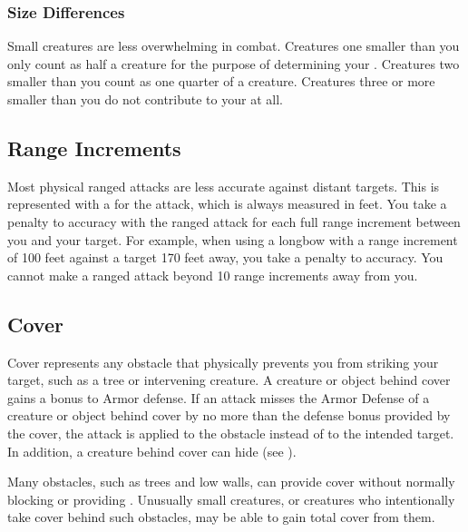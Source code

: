         \subsubsection{Size Differences}
            Small creatures are less overwhelming in combat.
            Creatures one  smaller than you only count as half a creature for the purpose of determining your .
            Creatures two  smaller than you count as one quarter of a creature.
            Creatures three or more  smaller than you do not contribute to your  at all.

    \subsection{Range Increments}\label{Range Increments}
        Most physical ranged attacks are less accurate against distant targets.
        This is represented with a  for the attack, which is always measured in feet.
        You take a  penalty to accuracy with the ranged attack for each full range increment between you and your target.
        For example, when using a longbow with a range increment of 100 feet against a target 170 feet away, you take a  penalty to accuracy.
        You cannot make a ranged attack beyond 10 range increments away from you.

    \subsection{Cover}\label{Cover}

        Cover represents any obstacle that physically prevents you from striking your target, such as a tree or intervening creature.
        A creature or object behind cover gains a  bonus to Armor defense.
        If an attack misses the Armor Defense of a creature or object behind cover by no more than the defense bonus provided by the cover,
        the attack is applied to the obstacle instead of to the intended target.
        In addition, a creature behind cover can hide (see ).

         Many obstacles, such as trees and low walls, can provide cover without normally blocking  or providing .
        Unusually small creatures, or creatures who intentionally take cover behind such obstacles, may be able to gain total cover from them.

